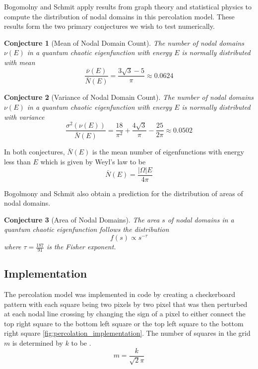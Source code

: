\documentclass{report}
\begin{document}
Bogomolny and Schmit apply results from graph theory and statistical physics to compute the distribution of nodal domains in this percolation model. These results form the two primary conjectures we wish to test numerically.

\newtheorem{conj}{Conjecture}
\begin{conj}[Mean of Nodal Domain Count]
  \label{conj:mean_prediction}
  The number of nodal domains $\nu(E)$ in a quantum chaotic eigenfunction with energy $E$ is normally distributed with mean
  \begin{equation}
    \frac{\bar{\nu}(E)}{\bar{N}(E)} = \frac{3 \sqrt{3} - 5}{\pi} \approx 0.0624
  \end{equation}
\end{conj}

\begin{conj}[Variance of Nodal Domain Count]
  \label{conj:variance_prediction}
  The number of nodal domains $\nu(E)$ in a quantum chaotic eigenfunction with energy $E$ is normally distributed with variance
  \begin{equation}
    \frac{\sigma^{2}(\nu(E))}{\bar{N}(E)} = \frac{18}{\pi^{2}} + \frac{4 \sqrt{3}}{\pi} - \frac{25}{2 \pi} \approx 0.0502
  \end{equation}
\end{conj}  

In both conjectures, $\bar{N}(E)$ is the mean number of eigenfunctions with energy less than $E$ which is given by Weyl's law \cite{garabedian} to be
\begin{equation}
  \label{eq:weyl}
  \bar{N}(E) = \frac{\vert \Omega \vert E}{4 \pi}
\end{equation}

Bogolmony and Schmit also obtain a prediction for the distribution of areas of nodal domains.

\begin{conj}[Area of Nodal Domains]
  \label{conj:area_prediction}
  The area $s$ of nodal domains in a quantum chaotic eigenfunction follows the distribution
  \begin{equation}
    f(s) \propto s^{-\tau}
  \end{equation}
  where $\tau = \frac{187}{91}$ is the Fisher exponent.
\end{conj}

\subsection{Implementation}
The percolation model was implemented in code by creating a checkerboard pattern with each square being two pixels by two pixel that was then perturbed at each nodal line crossing by changing the sign of a pixel to either connect the top right square to the bottom left square or the top left square to the bottom right square \ref{fig:percolation_implementation}. The number of squares in the grid $m$ is determined by $k$ to be \cite{bogomolny}.
\[
m = \frac{k}{\sqrt{2}\pi}
\]
\end{document}
